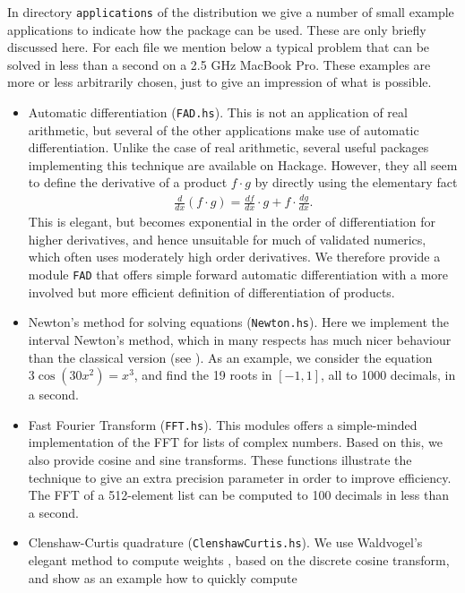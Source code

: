 \documentclass[9pt, a4, twocolumn]{article}
\begin{document}
In directory \texttt{applications} of the distribution we give a
number of small example applications to indicate how the
package can be used. These are only briefly discussed here. For each
file we mention below a typical problem that can be solved in less
than a second on a 2.5 GHz MacBook Pro. These examples are more or
less arbitrarily chosen, just to give an impression of what is possible.

\begin{itemize}
\item Automatic differentiation (\texttt{FAD.hs}). This is not an
  application of real arithmetic, but
several of the other applications make use of automatic
differentiation. Unlike the case of real arithmetic, several useful
packages implementing this technique are available on Hackage. However, they all seem to define
the derivative of a product $f \cdot g$ by directly using the
elementary fact 
\begin{align*}
\frac{d}{dx} (f \cdot g) =   \frac{df}{dx} \cdot g + f \cdot \frac{dg}{dx}.
\end{align*}
This is elegant, but becomes exponential in the order of
differentiation for higher derivatives, and hence
unsuitable for much of validated numerics, which often uses moderately high
order derivatives. We therefore provide a module \texttt{FAD} that offers
simple forward automatic differentiation with a more involved but more
efficient definition of differentiation of products.
\item Newton's method for solving equations (\texttt{Newton.hs}). Here
  we implement the interval Newton's method, which in many respects has much nicer
  behaviour than the classical version (see \cite{Tucker}).  As an
  example, we consider the equation $3 \cos (30 x^2) = x^3$, and find
  the 19 roots in $[-1,1]$, all to 1000 decimals, in a second.
\item Fast Fourier Transform (\texttt{FFT.hs}). This modules offers a
  simple-minded implementation of the FFT for lists of complex
  numbers. Based on this, we also provide cosine and sine transforms. 
These functions illustrate the technique to give an extra precision
parameter in order to improve efficiency. The FFT of a 512-element
list can be computed to 100 decimals in less than a second.
\item Clenshaw-Curtis quadrature (\texttt{ClenshawCurtis.hs}). 
We use Waldvogel's elegant method to compute weights \cite{Wald}, based on the
discrete cosine transform, and show as an
example how to quickly compute 
\begin{align*}

\end{align*}
\end{itemize}
\end{document}
